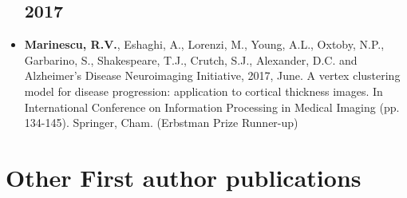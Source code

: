 \documentclass[a4paper,10pt]{article} %
\begin{document}
\begin{itemize}
\subsection*{2017}
\item[\talk] \textbf{Marinescu, R.V.}, Eshaghi, A., Lorenzi, M., Young, A.L., Oxtoby, N.P., Garbarino, S., Shakespeare, T.J., Crutch, S.J., Alexander, D.C. and Alzheimer’s Disease Neuroimaging Initiative, 2017, June. A vertex clustering model for disease progression: application to cortical thickness images. In International Conference on Information Processing in Medical Imaging (pp. 134-145). Springer, Cham. (Erbstman Prize Runner-up)



\end{itemize}

\section*{Other First author publications}
\end{document}
